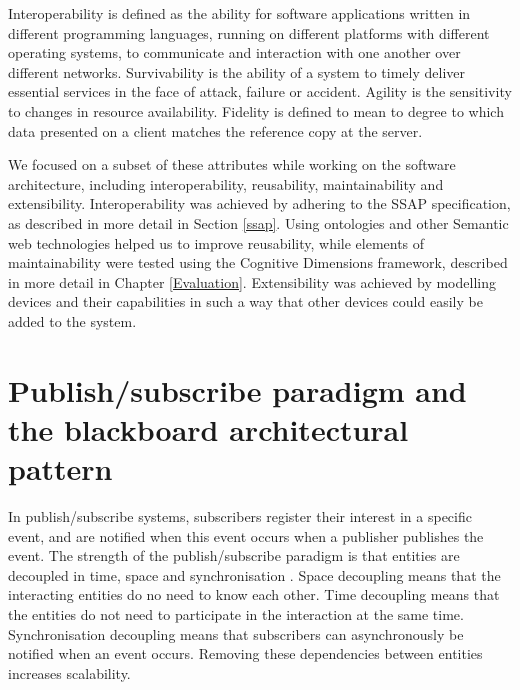 Interoperability is defined as the ability for software applications written in different programming languages, running on different platforms with different operating systems, to communicate and interaction with one another over different networks. Survivability is the ability of a system to timely deliver essential services in the face of attack, failure or accident. Agility is the sensitivity to changes in resource availability. Fidelity is defined to mean to degree to which data presented on a client matches the reference copy at the server.

We focused on a subset of these attributes while working on the software architecture, including interoperability, reusability, maintainability and extensibility. Interoperability was achieved by adhering to the \ac{SSAP} specification, as described in more detail in Section \ref{ssap}. Using ontologies and other Semantic web technologies helped us to improve reusability, while elements of maintainability were tested using the Cognitive Dimensions framework, described in more detail in Chapter \ref{Evaluation}. Extensibility was achieved by modelling devices and their capabilities in such a way that other devices could easily be added to the system.
% 


\section{Publish/subscribe paradigm and the blackboard architectural pattern}

In publish/subscribe systems, subscribers register their interest in a specific event, and are notified when this event occurs when a publisher publishes the event. The strength of the publish/subscribe paradigm is that entities are decoupled in time, space and synchronisation \cite{Eugster2003}. Space decoupling means that the interacting entities do no need to know each other. Time decoupling means that the entities do not need to participate in the interaction at the same time. Synchronisation decoupling means that subscribers can asynchronously be notified when an event occurs. Removing these dependencies between entities increases scalability.

